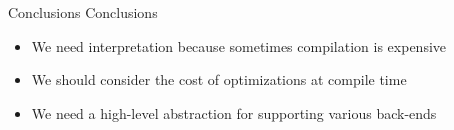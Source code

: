 \begin{frame}{Conclusions}
Conclusions
\begin{itemize}
\item We need interpretation because sometimes compilation is expensive 
\item We should consider the cost of optimizations at compile time
\item We need a high-level abstraction for supporting various back-ends
\end{itemize}
\end{frame}
